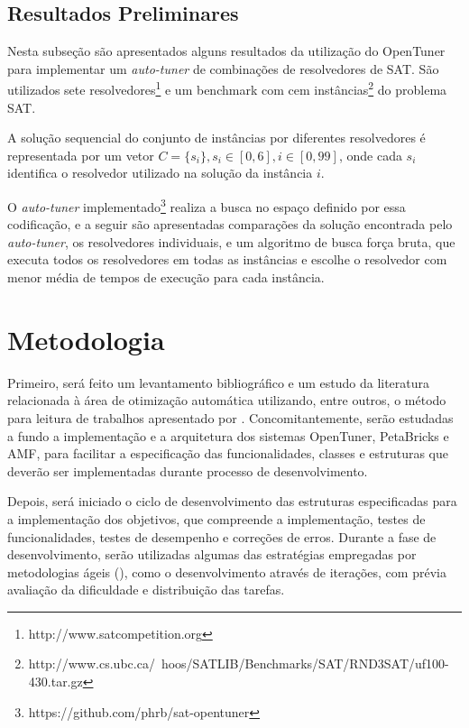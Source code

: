 \documentclass[a4paper, 12pt]{article}
\begin{document}
\subsection{Resultados Preliminares}

Nesta subseção são apresentados alguns resultados da utilização do OpenTuner
para implementar um \emph{auto-tuner} de combinações de resolvedores de
SAT. São utilizados sete resolvedores\footnote{http://www.satcompetition.org} 
e um benchmark com cem instâncias\footnote{http://www.cs.ubc.ca/~hoos/SATLIB/Benchmarks/SAT/RND3SAT/uf100-430.tar.gz} 
do problema SAT.

A solução sequencial do conjunto de instâncias por diferentes resolvedores é 
representada por um vetor $C = \{s_i\}, s_i \in [0,6], i \in [0,99]$, onde
cada $s_i$ identifica o resolvedor utilizado na solução da instância $i$.

O \emph{auto-tuner} 
implementado\footnote{https://github.com/phrb/sat-opentuner} realiza a busca no
espaço definido por essa codificação, e a seguir são apresentadas comparações 
da solução encontrada pelo \emph{auto-tuner}, os resolvedores individuais, e 
um algoritmo de busca força bruta, que executa todos os resolvedores em todas 
as instâncias e escolhe o resolvedor com menor média de tempos de execução 
para cada instância.

\section{Metodologia} \label{sec:met}

Primeiro, será feito um levantamento bibliográfico e um estudo da literatura
relacionada à área de otimização automática utilizando, entre outros, o método
para leitura de trabalhos apresentado por \citet{keshav2007howtoread}.
Concomitantemente, serão  estudadas a fundo a implementação e a arquitetura dos
sistemas OpenTuner, PetaBricks e AMF, para facilitar a especificação das
funcionalidades, classes e estruturas que deverão ser implementadas durante
processo de desenvolvimento.

Depois, será iniciado o ciclo de desenvolvimento das estruturas especificadas
para a implementação dos objetivos, que compreende a implementação,
testes de funcionalidades, testes de desempenho e correções de erros.
Durante a fase de desenvolvimento, serão utilizadas algumas das estratégias
empregadas por metodologias ágeis (\citet{beck2000extreme}), como o
desenvolvimento através de iterações, com prévia avaliação da dificuldade e
distribuição das tarefas.
\end{document}
